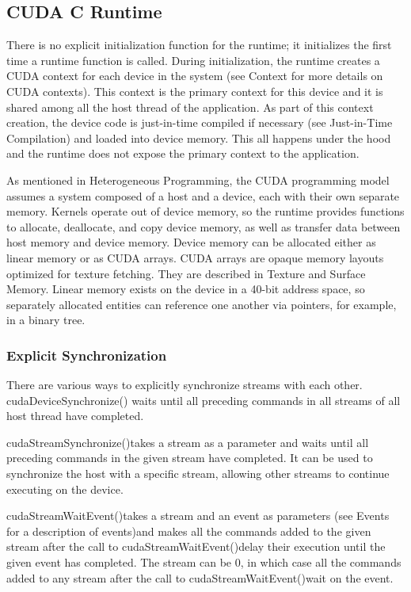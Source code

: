 \documentclass[openany]{book}
\begin{document}
\subsection{CUDA C Runtime}%
There is no explicit initialization function for the runtime; it initializes 
the first time a runtime function is called. During initialization, the runtime 
creates a CUDA context for each device in the system (see Context for more 
details on CUDA contexts). This context is the primary context for this device 
and it is shared among all the host thread of the application. As 
part of this context creation, the device code is just-in-time compiled if 
necessary (see Just-in-Time Compilation) and loaded into device memory. This 
all happens under the hood and the runtime does not expose the primary context 
to the application.~\cite[p.~3.2.1]{CUDA18}

As mentioned in Heterogeneous Programming, the CUDA programming model assumes a 
system composed of a host and a device, each with their own separate memory. 
Kernels operate out of device memory, so the runtime provides functions to 
allocate, deallocate, and copy device memory, as well as transfer data between 
host memory and device memory. Device memory can be allocated either as linear 
memory or as CUDA arrays. CUDA arrays are opaque memory layouts optimized for 
texture fetching. They are described in Texture and Surface Memory. Linear 
memory exists on the device in a 40-bit address space, so separately allocated 
entities can reference one another via pointers, for example, in a binary 
tree.~\cite[p.~3.2.2]{CUDA18}

\subsubsection{Explicit Synchronization}%
There are various ways to explicitly synchronize streams with each other.
cudaDeviceSynchronize() waits until all preceding commands in all streams of 
all host thread have completed.

cudaStreamSynchronize()takes a stream as a parameter and waits until all 
preceding commands in the given stream have completed. It can be used to 
synchronize the host with a specific stream, allowing other streams to 
continue executing on the device.

cudaStreamWaitEvent()takes a stream and an event as parameters (see Events 
for a description of events)and makes all the commands added to the given 
stream after the call to cudaStreamWaitEvent()delay their execution until the 
given event has completed. The stream can be 0, in which case all the commands 
added to any stream after the call to cudaStreamWaitEvent()wait on the event.
\end{document}
